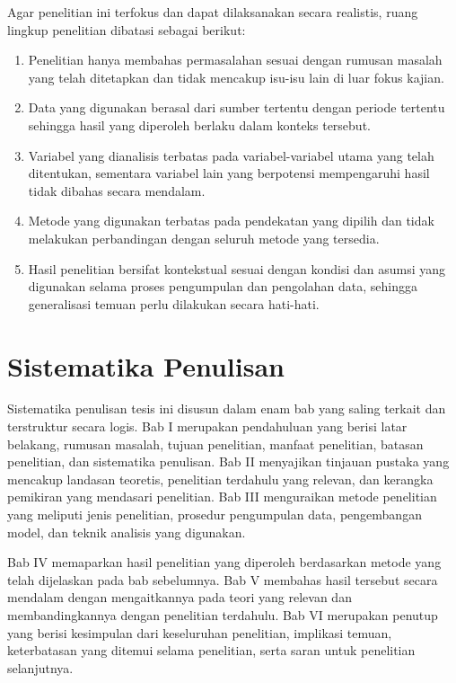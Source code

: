 Agar penelitian ini terfokus dan dapat dilaksanakan secara realistis, ruang lingkup penelitian dibatasi sebagai berikut:
\begin{enumerate}
  \item Penelitian hanya membahas permasalahan sesuai dengan rumusan masalah yang telah ditetapkan dan tidak mencakup isu-isu lain di luar fokus kajian.
  \item Data yang digunakan berasal dari sumber tertentu dengan periode tertentu sehingga hasil yang diperoleh berlaku dalam konteks tersebut.
  \item Variabel yang dianalisis terbatas pada variabel-variabel utama yang telah ditentukan, sementara variabel lain yang berpotensi mempengaruhi hasil tidak dibahas secara mendalam.
  \item Metode yang digunakan terbatas pada pendekatan yang dipilih dan tidak melakukan perbandingan dengan seluruh metode yang tersedia.
  \item Hasil penelitian bersifat kontekstual sesuai dengan kondisi dan asumsi yang digunakan selama proses pengumpulan dan pengolahan data, sehingga generalisasi temuan perlu dilakukan secara hati-hati.
\end{enumerate}

\section{Sistematika Penulisan}

Sistematika penulisan tesis ini disusun dalam enam bab yang saling terkait dan terstruktur secara logis. Bab I merupakan pendahuluan yang berisi latar belakang, rumusan masalah, tujuan penelitian, manfaat penelitian, batasan penelitian, dan sistematika penulisan. Bab II menyajikan tinjauan pustaka yang mencakup landasan teoretis, penelitian terdahulu yang relevan, dan kerangka pemikiran yang mendasari penelitian. Bab III menguraikan metode penelitian yang meliputi jenis penelitian, prosedur pengumpulan data, pengembangan model, dan teknik analisis yang digunakan.

Bab IV memaparkan hasil penelitian yang diperoleh berdasarkan metode yang telah dijelaskan pada bab sebelumnya. Bab V membahas hasil tersebut secara mendalam dengan mengaitkannya pada teori yang relevan dan membandingkannya dengan penelitian terdahulu. Bab VI merupakan penutup yang berisi kesimpulan dari keseluruhan penelitian, implikasi temuan, keterbatasan yang ditemui selama penelitian, serta saran untuk penelitian selanjutnya.
